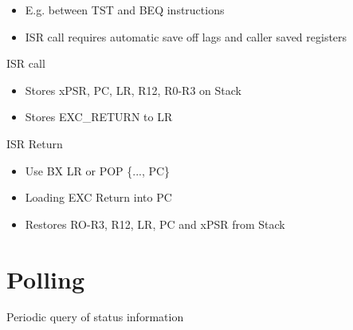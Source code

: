 \begin{itemize}
  \item E.g. between TST and BEQ instructions
  \item ISR call requires automatic save off lags and caller saved registers
\end{itemize}

ISR call

\begin{itemize}
  \item Stores xPSR, PC, LR, R12, R0-R3 on Stack
  \item Stores EXC\_RETURN to LR
\end{itemize}

ISR Return

\begin{itemize}
  \item Use BX LR or POP \{..., PC\}
  \item Loading EXC Return into PC
  \item Restores RO-R3, R12, LR, PC and xPSR from Stack
\end{itemize}

\section*{Polling}
Periodic query of status information

